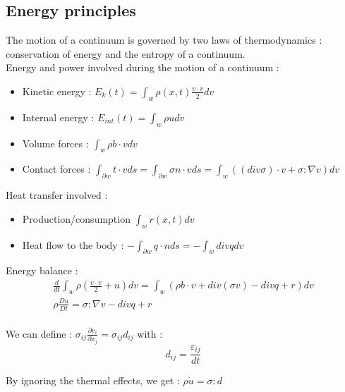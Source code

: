 \documentclass[../main.tex]{subfiles}
\begin{document}
\subsection{Energy principles}
The motion of a continuum is governed by two laws of thermodynamics : conservation of energy and the entropy of a continuum.\\

Energy and power involved during the motion of a continuum : \begin{itemize}
    \item Kinetic energy : $E_k (t) = \int_w \rho(x,t) \frac{v \cdot v}{2}dv$\\
    \item Internal energy : $E_{int}(t) = \int_w \rho u dv$\\
    \item Volume forces : $\int_w \rho b \cdot v dv$\\
    \item Contact forces : $\int_{\partial w} t\cdot v ds = \int_{\partial w} \sigma n \cdot v ds = \int_w ((div \sigma) \cdot v + \sigma : \nabla v)dv$\\
\end{itemize}

Heat transfer involved : \begin{itemize}
    \item Production/consumption $\int_w r(x,t)dv$\\
    \item Heat flow to the body : $-\int_{\partial w} q\cdot n ds = -\int_w div qdv$\\
\end{itemize}

Energy balance : \begin{equation}\begin{gathered}
    \frac{d}{dt} \int_w \rho (\frac{v\cdot v}{2}+u)dv = \int_w (\rho b \cdot v+ div(\sigma v)-div q + r)dv\\
    \rho \frac{Du}{Dt} = \sigma : \nabla v - div q + r\\
    \end{gathered}
\end{equation}

We can define : $\sigma_{ij} \frac{\partial v_i}{\partial x_j} = \sigma_{ij} d_{ij}$ with : \begin{equation}
    d_{ij} = \frac{\varepsilon_{ij}}{dt}
\end{equation}

By ignoring the thermal effects, we get : $\rho \dot{u} = \sigma : d$\\
\end{document}
